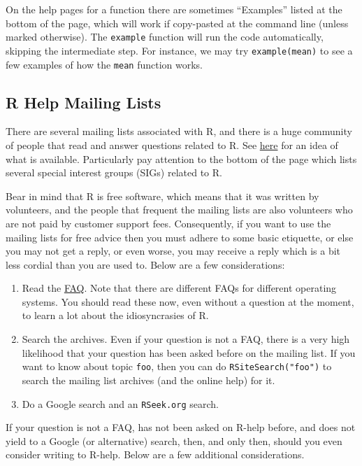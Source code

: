 \documentclass[captions=tableheading]{scrbook}
\begin{document}
On the help pages for a function there are sometimes ``Examples'' listed at the bottom of the page, which will work if copy-pasted at the command line (unless marked otherwise). The \texttt{example} function will run the code automatically, skipping the intermediate step. For instance, we may try \texttt{example(mean)} to see a few examples of how the \texttt{mean} function works.
\subsection{\textsf{R} Help Mailing Lists}
\label{sec-2-4-1}


There are several mailing lists associated with \textsf{R}, and there is a huge community of people that read and answer questions related to \textsf{R}. See \href{http://www.r-project.org/mail.html}{here} for an idea of what is available. Particularly pay attention to the bottom of the page which lists several special interest groups (SIGs) related to \textsf{R}.

Bear in mind that \textsf{R} is free software, which means that it was written by volunteers, and the people that frequent the mailing lists are also volunteers who are not paid by customer support fees. Consequently, if you want to use the mailing lists for free advice then you must adhere to some basic etiquette, or else you may not get a reply, or even worse, you may receive a reply which is a bit less cordial than you are used to. Below are a few considerations: 
\begin{enumerate}
\item Read the \href{http://cran.r-project.org/faqs.html}{FAQ}. Note that there are different FAQs for different operating systems. You should read these now, even without a question at the moment, to learn a lot about the idiosyncrasies of \textsf{R}.
\item Search the archives. Even if your question is not a FAQ, there is a very high likelihood that your question has been asked before on the mailing list. If you want to know about topic \texttt{foo}, then you can do \texttt{RSiteSearch("foo")} to search the mailing list archives (and the online help) for it.
\item Do a Google search and an \texttt{RSeek.org} search.
\end{enumerate}

If your question is not a FAQ, has not been asked on \textsf{R}-help before, and does not yield to a Google (or alternative) search, then, and only then, should you even consider writing to \textsf{R}-help. Below are a few additional considerations. 
\end{document}
